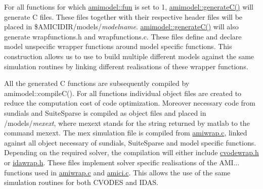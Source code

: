 For all functions for which \hyperlink{classamimodel_a743fa290dbc0a67a3843d5ab0426e9b4}{amimodel\+::fun} is set to 1, \hyperlink{classamimodel_af2ce5001c2320c95471ecb8c3d73bdbb}{amimodel\+::generate\+C()} will generate C files. These files together with their respective header files will be placed in \$\+A\+M\+I\+C\+I\+D\+I\+R/models/{\itshape modelname}. \hyperlink{classamimodel_af2ce5001c2320c95471ecb8c3d73bdbb}{amimodel\+::generate\+C()} will also generate wrapfunctions.\+h and wrapfunctions.\+c. These files define and declare model unspecific wrapper functions around model specific functions. This construction allows us to use to build multiple different models against the same simulation routines by linking different realisations of these wrapper functions.

All the generated C functions are subsequently compiled by amimodel\+::compile\+C(). For all functions individual object files are created to reduce the computation cost of code optimization. Moreover necessary code from sundials and Suite\+Sparse is compiled as object files and placed in /models/{\itshape mexext}, where mexext stands for the string returned by matlab to the command mexext. The mex simulation file is compiled from \hyperlink{amiwrap_8c}{amiwrap.\+c}, linked against all object necessary of sundials, Suite\+Sparse and model specific functions. Depending on the required solver, the compilation will either include \hyperlink{cvodewrap_8h_source}{cvodewrap.\+h} or \hyperlink{idawrap_8h_source}{idawrap.\+h}. These files implement solver specific realisations of the A\+M\+I... functions used in \hyperlink{amiwrap_8c}{amiwrap.\+c} and \hyperlink{amici_8c}{amici.\+c}. This allows the use of the same simulation routines for both C\+V\+O\+D\+E\+S and I\+D\+A\+S. 